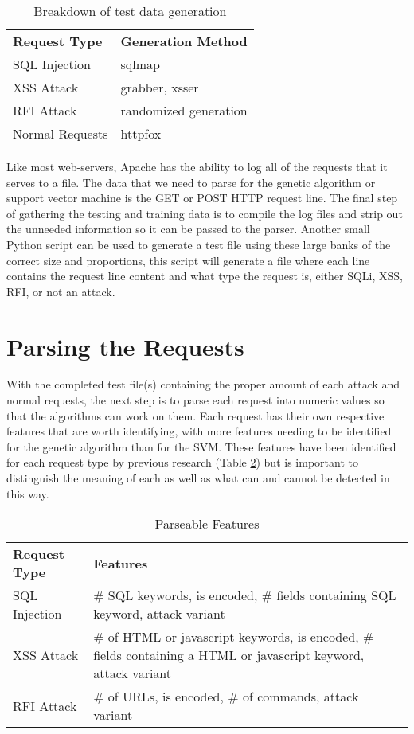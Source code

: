 \begin{table}
	\centering
	\begin{tabular}{|l|l|}
	\hline
		\textbf{Request Type} & \textbf{Generation Method}\\
	\hhline{|=|=|}
		SQL Injection & sqlmap\\
	\hline
		XSS Attack & grabber, xsser\\
	\hline
		RFI Attack & randomized generation\\
	\hline
		Normal Requests & httpfox\\
	\hline
	\end{tabular}
	\caption{Breakdown of test data generation}
	\label{tab:tools}
\end{table}

Like most web-servers, Apache has the ability to log all of the requests that it serves to a file.  The data that we need to parse for the genetic algorithm or support vector machine is the GET or POST HTTP request line.  The final step of gathering the testing and training data is to compile the log files and strip out the unneeded information so it can be passed to the parser.  Another small Python script can be used to generate a test file using these large banks of the correct size and proportions, this script will generate a file where each line contains the request line content and what type the request is, either SQLi, XSS, RFI, or not an attack.

\section{Parsing the Requests}

With the completed test file(s) containing the proper amount of each attack and normal requests, the next step is to parse each request into numeric values so that the algorithms can work on them.  Each request has their own respective features that are worth identifying, with more features needing to be identified for the genetic algorithm than for the SVM.  These features have been identified for each request type by previous research (Table \ref{tab:features}) but is important to distinguish the meaning of each as well as what can and cannot be detected in this way. %

\begin{table}
	\centering
	\label{tab:features}
	\begin{tabular}{|p{1.5in}|p{4.5in}|}
	\hline
		\textbf{Request Type} & \textbf{Features}\\
	\hhline{|=|=|}
		SQL Injection & \# SQL keywords, is encoded, \# fields containing SQL keyword, attack variant\\
	\hline
		XSS Attack & \# of HTML or javascript keywords, is encoded, \# fields containing a HTML or javascript keyword, attack variant\\
	\hline
		RFI Attack & \# of URLs, is encoded, \# of commands, attack variant\\
	\hline
	\end{tabular}
	\caption{Parseable Features}
\end{table}

